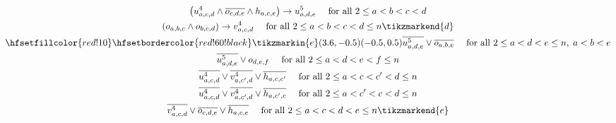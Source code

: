 \begin{figure}
\begin{spreadlines}{16pt}
\begin{gather}
  \left(\uvar_{a,c,d} \land \ov{\orvar_{c,d,e}} \land \hvar_{a,c,e}\right)\rightarrow \ufvar_{a, d, e} \quad \text{ for all } 2 \leq a < b < c < d\label{eq:constraint-8}\\
  \left(\orvar_{a, b, c} \land \orvar_{b, c, d}\right) \rightarrow \vvar_{a, c, d} \quad \text{ for all } 2 \leq a < b < c < d \leq n \tikzmarkend{d}\label{eq:constraint-9}\\
\hfsetfillcolor{red!10}
\hfsetbordercolor{red!60!black}
\tikzmarkin{e}(3.6,-0.5)(-0.5,0.5)
  \ov{\ufvar_{a,d,e}} \lor \ov{\orvar_{a, b, e}} \quad \text { for all } 2 \leq a < d < e \leq n, \; a < b < e\label{eq:constraint-10}\\
  \ov{\ufvar_{a,d,e}} \lor \orvar_{d, e, f} \quad \text { for all } 2 \leq a < d < e < f\leq n\label{eq:constraint-11}\\
  \ov{\uvar_{a,c,d}} \lor \ov{\vvar_{a, c', d}} \lor \ov{\hvar_{a,c,c'}} \quad \text{ for all } 2 \leq a < c < c' < d \leq n\label{eq:constraint-12}\\
  \ov{\uvar_{a,c,d}} \lor \ov{\vvar_{a, c', d}} \lor \ov{\hvar_{a,c',c}} \quad \text{ for all } 2 \leq a < c' < c < d \leq n\label{eq:constraint-13}\\
  \ov{\vvar_{a,c,d}} \lor \ov{\orvar_{c, d, e}} \lor \ov{\hvar_{a,c,e}} \quad \text{ for all } 2 \leq a < c < d < e \leq n\label{eq:constraint-14x}
\tikzmarkend{e}
  \end{gather}
\end{spreadlines}
\end{figure}

